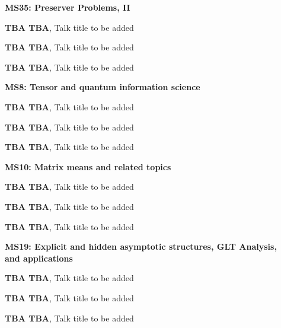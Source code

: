 \documentclass[ILAS2025-program.tex]{subfiles}
\begin{document}
\begin{description}
\begin{description}
        \end{description}
    \begin{description}
    \item[] \textbf{MS35: Preserver Problems, II} 
    \item[] \textbf{TBA TBA}, Talk title to be added
        \item[] \textbf{TBA TBA}, Talk title to be added
        \item[] \textbf{TBA TBA}, Talk title to be added
        \end{description}
    \begin{description}
    \item[] \textbf{MS8: Tensor and quantum information science} 
    \item[] \textbf{TBA TBA}, Talk title to be added
        \item[] \textbf{TBA TBA}, Talk title to be added
        \item[] \textbf{TBA TBA}, Talk title to be added
        \end{description}
    \begin{description}
    \item[] \textbf{MS10: Matrix means and related topics} 
    \item[] \textbf{TBA TBA}, Talk title to be added
        \item[] \textbf{TBA TBA}, Talk title to be added
        \item[] \textbf{TBA TBA}, Talk title to be added
        \end{description}
    \begin{description}
    \item[] \textbf{MS19: Explicit and hidden asymptotic structures, GLT Analysis, and applications} 
    \item[] \textbf{TBA TBA}, Talk title to be added
        \item[] \textbf{TBA TBA}, Talk title to be added
        \item[] \textbf{TBA TBA}, Talk title to be added
        \end{description}
    \begin{description}

\end{description}
\end{description}
\end{document}
